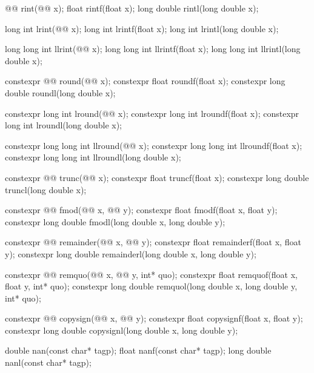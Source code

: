 \begin{codeblock}
{  @@ rint(@@ x);
  float rintf(float x);
  long double rintl(long double x);

  long int lrint(@@ x);
  long int lrintf(float x);
  long int lrintl(long double x);

  long long int llrint(@@ x);
  long long int llrintf(float x);
  long long int llrintl(long double x);

  constexpr @@ round(@@ x);
  constexpr float roundf(float x);
  constexpr long double roundl(long double x);

  constexpr long int lround(@@ x);
  constexpr long int lroundf(float x);
  constexpr long int lroundl(long double x);

  constexpr long long int llround(@@ x);
  constexpr long long int llroundf(float x);
  constexpr long long int llroundl(long double x);

  constexpr @@ trunc(@@ x);
  constexpr float truncf(float x);
  constexpr long double truncl(long double x);

  constexpr @@ fmod(@@ x, @@ y);
  constexpr float fmodf(float x, float y);
  constexpr long double fmodl(long double x, long double y);

  constexpr @@ remainder(@@ x, @@ y);
  constexpr float remainderf(float x, float y);
  constexpr long double remainderl(long double x, long double y);

  constexpr @@ remquo(@@ x, @@ y, int* quo);
  constexpr float remquof(float x, float y, int* quo);
  constexpr long double remquol(long double x, long double y, int* quo);

  constexpr @@ copysign(@@ x, @@ y);
  constexpr float copysignf(float x, float y);
  constexpr long double copysignl(long double x, long double y);

  double nan(const char* tagp);
  float nanf(const char* tagp);
  long double nanl(const char* tagp);

}
\end{codeblock}
